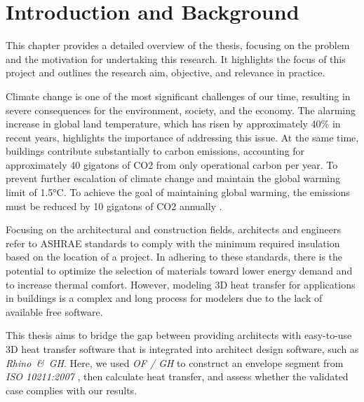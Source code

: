 \chapter{Introduction and Background}
This chapter provides a detailed overview of the thesis, focusing on the problem and the motivation for undertaking this research. It highlights the focus of this project and outlines the research aim, objective, and relevance in practice.

Climate change is one of the most significant challenges of our time, resulting in severe consequences for the environment, society, and the economy. The alarming increase in global land temperature, which has risen by approximately 40\% \cite{glb} in recent years, highlights the importance of addressing this issue. At the same time, buildings contribute substantially to carbon emissions, accounting for approximately 40 gigatons of CO2 from only operational carbon per year. To prevent further escalation of climate change and maintain the global warming limit of 1.5°C. To achieve the goal of maintaining global warming, the emissions must be reduced by 10 gigatons of CO2 annually \cite{ipcc}.

Focusing on the architectural and construction fields, architects and engineers refer to \gls{ASHRAE} standards to comply with the minimum required insulation based on the location of a project. 
In adhering to these standards, there is the potential to optimize the selection of materials toward lower energy demand and to increase thermal comfort. However, modeling 3D heat transfer for applications in buildings is a complex and long process for modelers due to the lack of available free software. 

This thesis aims to bridge the gap between providing architects with easy-to-use 3D heat transfer software that is integrated into architect design software, such as \textit{Rhino\, \&\, \gls{GH}}. Here, we used \textit{\gls{OF} / \gls{GH}} to construct an envelope segment from \textit{ISO 10211:2007}
\cite{ISO}, then calculate heat transfer, and assess whether the validated case complies with our results. 



